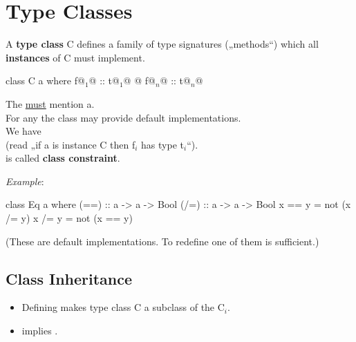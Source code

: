 

\chapter{Type Classes} %
\label{cha:type_classes}

A \textbf{type class} C defines a family of type signatures („methods“) which all \textbf{instances} of C must implement.

\begin{codebox}[haskell]
class C a where
    f@$_1$@ :: t@$_1$@
    @\dots@
    f@$_n$@ :: t@$_n$@
\end{codebox}
The  \underline{must} mention a.\\
For any  the class may provide default implementations. \\
We have  \\ (read „if a is instance C then f$_i$ has type t$_i$“).\\
 is called \textbf{class constraint}.

\textit{Example}:

\begin{codebox}[haskell]
class Eq a where
    (==) :: a -> a -> Bool
    (/=) :: a -> a -> Bool
    x == y = not (x /= y)
    x /= y = not (x == y)
\end{codebox}
(These are default implementations. To redefine one of them is sufficient.)



\section{Class Inheritance}

\begin{itemize}
    \item Defining  makes type class C a subclass of the C$_i$.\\
    \item {} implies .
\end{itemize}



